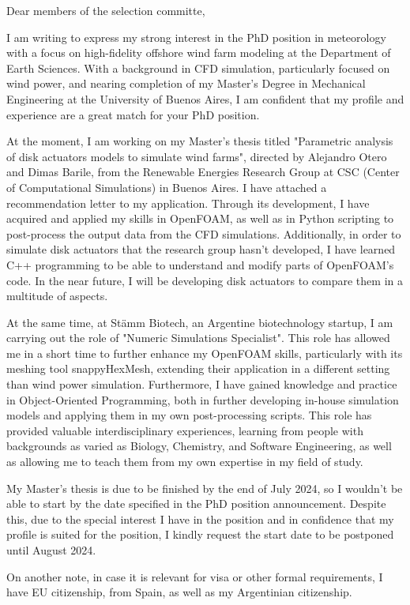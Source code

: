 \documentclass{letter}
\newcommand{\thesisname}{Parametric analysis of disk actuators models to simulate wind farms}
\begin{document}
\begin{letter}{}
\opening{Dear members of the selection committe,}
I am writing to express my strong interest in the PhD position in meteorology with a focus on high-fidelity offshore wind farm modeling at the Department of Earth Sciences.
  With a background in CFD simulation, particularly focused on wind power, and nearing completion of my Master's Degree in Mechanical Engineering at the University of Buenos Aires, I am confident that my profile and experience are a great match for your PhD position.

At the moment, I am working on my Master's thesis titled "\thesisname", directed by Alejandro Otero and Dimas Barile, from the Renewable Energies Research Group at CSC (Center of Computational Simulations) in Buenos Aires. 
  I have attached a recommendation letter to my application. 
  Through its development, I have acquired and applied my skills in OpenFOAM, as well as in Python scripting to post-process the output data from the CFD simulations. 
  Additionally, in order to simulate disk actuators that the research group hasn't developed, I have learned C++ programming to be able to understand and modify parts of OpenFOAM's code. 
  In the near future, I will be developing disk actuators to compare them in a multitude of aspects.

At the same time, at Stämm Biotech, an Argentine biotechnology startup, I am carrying out the role of "Numeric Simulations Specialist". 
  This role has allowed me in a short time to further enhance my OpenFOAM skills, particularly with its meshing tool snappyHexMesh, extending their application in a different setting than wind power simulation. 
  Furthermore, I have gained knowledge and practice in Object-Oriented Programming, both in further developing in-house simulation models and applying them in my own post-processing scripts. 
  This role has provided valuable interdisciplinary experiences, learning from people with backgrounds as varied as Biology, Chemistry, and Software Engineering, as well as allowing me to teach them from my own expertise in my field of study.

  My Master's thesis is due to be finished by the end of July 2024, so I wouldn't be able to start by the date specified in the PhD position announcement. 
  Despite this, due to the special interest I have in the position and in confidence that my profile is suited for the position, I kindly request the start date to be postponed until August 2024.

On another note, in case it is relevant for visa or other formal requirements, I have EU citizenship, from Spain, as well as my Argentinian citizenship.


\end{letter}
\end{document}
